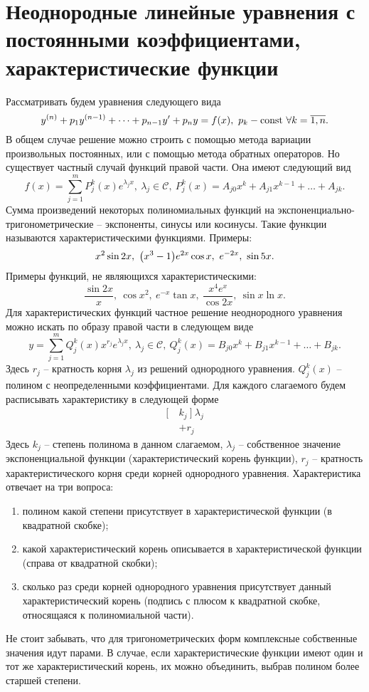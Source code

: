 \section{Неоднородные линейные уравнения с постоянными коэффициентами, характеристические функции}

    Рассматривать будем уравнения следующего вида
    \[
        y^{(n)} + p_1 y^{(n - 1)} + \dots + p_{n - 1} y' + p_n y = f(x), ~ p_k - \mathrm{const} ~ \forall k = \overline{1, n}.
    \]
    В общем случае решение можно строить с помощью метода вариации произвольных постоянных, или с помощью метода обратных операторов. Но существует частный случай функций правой части. Она имеют следующий вид
    \[
        f(x) = \sum^m_{j = 1} P^k_j(x) e^{\lambda_j x}, ~ \lambda_j \in \mathscr{C}, ~ P^k_j(x) = A_{j0} x^k + A_{j1} x^{k - 1} + \dots + A_{jk}.
    \]
    Сумма произведений некоторых полиномиальных функций на экспоненциально-тригонометрические -- экспоненты, синусы или косинусы. Такие функции называются характеристическими функциями. Примеры:
    \[
        x^2 \sin{2x}, ~ \bigl( x^3 - 1 \bigr) e^{2x} \cos{x}, ~ e^{-2x}, ~ \sin{5x}.
    \]
    Примеры функций, не являющихся характеристическими:
    \[
        \dfrac{\sin{2x}}{x}, ~ \cos{x^2}, ~ e^{-x} \tan{x}, ~ \dfrac{x^4 e^x}{\cos{2x}}, ~ \sin{x} \ln{x}. 
    \]
    Для характеристических функций частное решение неоднородного уравнения можно искать по образу правой части в следующем виде
    \[
        y = \sum^m_{j = 1} Q^k_j(x) x^{r_j} e^{\lambda_j x}, ~ \lambda_j \in \mathscr{C}, ~ Q^k_j(x) = B_{j0} x^k + B_{j1} x^{k - 1} + \dots + B_{jk}.
    \]
    Здесь $ r_j $ -- кратность корня $ \lambda_j $ из решений однородного уравнения. $ Q^k_j(x) $ -- полином с неопределенными коэффициентами. Для каждого слагаемого будем расписывать характеристику в следующей форме
    \[
        \begin{split}
            \Big[ ~ &k_j ~ \Big] ~ \lambda_j \\
                    & + r_j
        \end{split}
    \]
    Здесь $ k_j $ -- степень полинома в данном слагаемом, $ \lambda_j $ -- собственное значение экспоненциальной функции (характеристический корень функции), $ r_j $ -- кратность характеристического корня среди корней однородного уравнения. Характеристика отвечает на три вопроса:
    \begin{enumerate}
        \item полином какой степени присутствует в характеристической функции (в квадратной скобке);
        \item какой характеристический корень описывается в характеристической функции (справа от квадратной скобки);
        \item сколько раз среди корней однородного уравнения присутствует данный характеристический корень (подпись с плюсом к квадратной скобке, относящаяся к полиномиальной части).
    \end{enumerate}
    Не стоит забывать, что для тригонометрических форм комплексные собственные значения идут парами. В случае, если характеристические функции имеют один и тот же характеристический корень, их можно объединить, выбрав полином более старшей степени.

